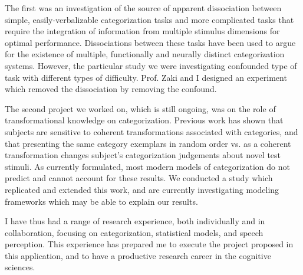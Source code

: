 \documentclass[12pt]{article}
\begin{document}
The first was an investigation of the source of apparent dissociation between simple, easily-verbalizable categorization tasks and more complicated tasks that require the integration of information from multiple stimulus dimensions for optimal performance.  Dissociations between these tasks have been used to argue for the existence of multiple, functionally and neurally distinct categorization systems.  However, the particular study we were investigating confounded type of task with different types of difficulty.  Prof. Zaki and I designed an experiment which removed the dissociation by removing the confound.

The second project we worked on, which is still ongoing, was on the role of transformational knowledge on categorization.  Previous work has shown that subjects are sensitive to coherent transformations associated with categories, and that presenting the same category exemplars in random order vs. as a coherent transformation changes subject's categorization judgements about novel test stimuli.  As currently formulated, most modern models of categorization do not predict and cannot account for these results.  We conducted a study which replicated and extended this work, and are currently investigating modeling frameworks which may be able to explain our results.  

I have thus had a range of research experience, both individually and in collaboration, focusing on categorization, statistical models, and speech perception.  This experience has prepared me to execute the project proposed in this application, and to have a productive research career in the cognitive sciences.


{
\fontsize{10}{10}
\selectfont

}
\end{document}
